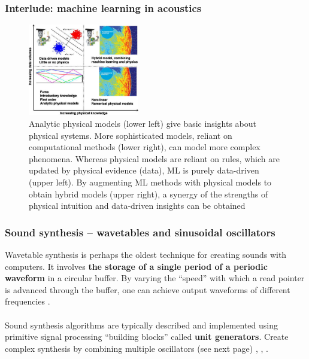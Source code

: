 \documentclass{beamer}
\begin{document}

\begin{frame}
	\frametitle{Interlude: machine learning in acoustics}
	\begin{figure}
	\includegraphics[height=4cm]{./6_5_ml_acoustics.jpg}
		\caption{Analytic physical models (lower left) give basic insights about physical systems. More sophisticated models, reliant on computational methods (lower right), can model more complex phenomena. Whereas physical models are reliant on rules, which are updated by physical evidence (data), ML is purely data-driven (upper left). By augmenting ML methods with physical models to obtain hybrid models (upper right), a synergy of the strengths of physical intuition and data-driven insights can be obtained }
	\end{figure}
\end{frame}


\begin{frame}
	\frametitle{Sound synthesis -- wavetables and sinusoidal oscillators}
	Wavetable synthesis is perhaps the oldest technique for creating sounds with computers. It involves \textbf{the storage of a single period of a periodic waveform} in a circular buffer. By varying the ``speed'' with which a read pointer is advanced through the buffer, one can achieve output waveforms of different frequencies .\\\ \\
	Sound synthesis algorithms are typically described and implemented using primitive signal processing ``building blocks'' called \textbf{unit generators}. Create complex synthesis by combining multiple oscillators (see next page) , , .
\end{frame}
\end{document}
